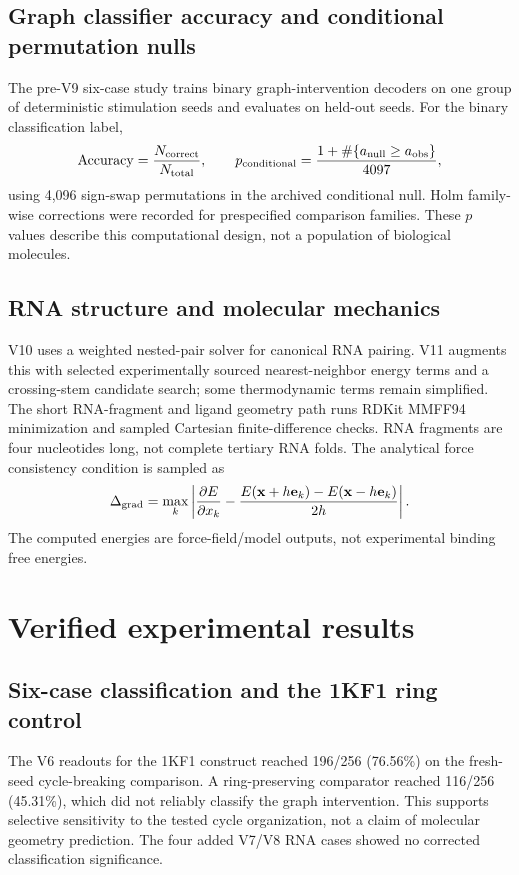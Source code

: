 \documentclass[11pt,a4paper]{article}
\begin{document}
\subsection{Graph classifier accuracy and conditional permutation nulls}
The pre-V9 six-case study trains binary graph-intervention decoders on one group of deterministic stimulation seeds and evaluates on held-out seeds. For the binary classification label,
\begin{equation}
\mathrm{Accuracy}=\frac{N_{\rm correct}}{N_{\rm total}},\qquad
p_{\rm conditional}=\frac{1+\#\{a_{\rm null}\ge a_{\rm obs}\}}{4097},
\end{equation}
using 4,096 sign-swap permutations in the archived conditional null. Holm family-wise corrections were recorded for prespecified comparison families. These $p$ values describe this computational design, not a population of biological molecules.

\subsection{RNA structure and molecular mechanics}
V10 uses a weighted nested-pair solver for canonical RNA pairing. V11 augments this with selected experimentally sourced nearest-neighbor energy terms and a crossing-stem candidate search; some thermodynamic terms remain simplified. The short RNA-fragment and ligand geometry path runs RDKit MMFF94 minimization and sampled Cartesian finite-difference checks. RNA fragments are four nucleotides long, not complete tertiary RNA folds. The analytical force consistency condition is sampled as
\begin{equation}
\Delta_{\rm grad}=\max_k\left|\frac{\partial E}{\partial x_k} - \frac{E(\mathbf x+h\mathbf e_k)-E(\mathbf x-h\mathbf e_k)}{2h}\right|.
\end{equation}
The computed energies are force-field/model outputs, not experimental binding free energies.

\section{Verified experimental results}
\subsection{Six-case classification and the 1KF1 ring control}
The V6 readouts for the 1KF1 construct reached 196/256 (76.56\%) on the fresh-seed cycle-breaking comparison. A ring-preserving comparator reached 116/256 (45.31\%), which did not reliably classify the graph intervention. This supports selective sensitivity to the tested cycle organization, not a claim of molecular geometry prediction. The four added V7/V8 RNA cases showed no corrected classification significance.
\end{document}
